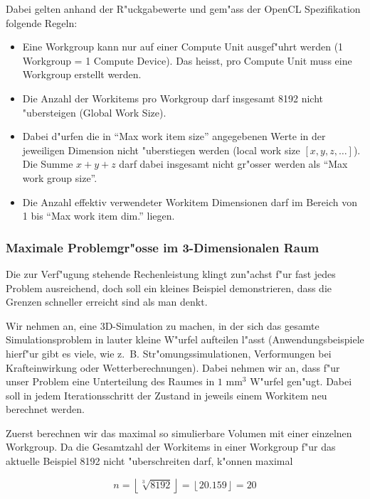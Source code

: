 \begin{refsection}
\begin{description}
\end{description}


\noindent Dabei gelten anhand der R"uckgabewerte und gem"ass der OpenCL
Spezifikation\cite{crypto:opencl_ref} folgende Regeln:

\begin{itemize}
 \item Eine Workgroup kann nur auf einer Compute Unit ausgef"uhrt werden (1 Workgroup = 1 
       Compute Device). Das heisst, pro Compute Unit muss eine Workgroup erstellt werden.
 \item Die Anzahl der Workitems pro Workgroup darf insgesamt 8192 nicht
	 "ubersteigen (Global Work Size).
 \item Dabei d"urfen die in ``Max work item size'' angegebenen Werte in der jeweiligen 
       Dimension nicht "uberstiegen werden (local work size $[x,y,z,\ldots]$).
			 Die Summe $x + y + z$ darf dabei insgesamt nicht gr"osser werden als ``Max work group size''.
 \item Die Anzahl effektiv verwendeter Workitem Dimensionen darf im Bereich von 1 bis
       ``Max work item dim.'' liegen.
\end{itemize}


\subsubsection {Maximale Problemgr"osse im 3-Dimensionalen Raum}
\label{crypto:problemgroesse:3d}

Die zur Verf"ugung stehende Rechenleistung klingt zun"achst f"ur fast jedes Problem
ausreichend, doch soll ein kleines Beispiel demonstrieren, dass die Grenzen
schneller erreicht sind als man denkt.

Wir nehmen an, eine 3D-Simulation zu machen, in der sich das gesamte
Simulationsproblem in lauter kleine W"urfel aufteilen l"asst
(Anwendungsbeispiele hierf"ur gibt es viele, wie z.~B. Str"omungssimulationen,
Verformungen bei Krafteinwirkung oder Wetterberechnungen). Dabei nehmen wir an,
dass f"ur unser Problem eine Unterteilung des Raumes in $1\textrm{ mm}^{3}$
W"urfel gen"ugt. Dabei soll in jedem Iterationsschritt der Zustand in jeweils
einem Workitem neu berechnet werden.

Zuerst berechnen wir das maximal so simulierbare Volumen mit einer einzelnen
Workgroup.  Da die Gesamtzahl der Workitems in einer Workgroup f"ur das aktuelle
Beispiel 8192 nicht "uberschreiten darf, k"onnen maximal

\[
 n = \left\lfloor\sqrt[3]{8192}\right\rfloor = \left\lfloor20.159\right\rfloor = 20
\]


\end{refsection}

